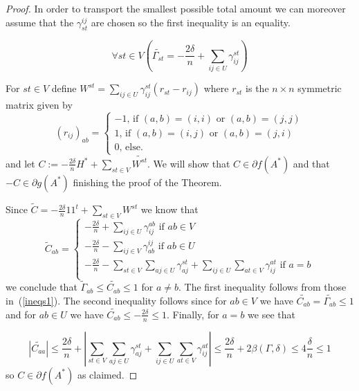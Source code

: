 \documentclass[12pt]{amsart}
\theoremstyle{remark}
\begin{document}
\begin{proof}
In order to transport the smallest possible total amount we can moreover assume that the $\gamma_{st}^{ij}$ are chosen so the first inequality is an equality.

\[\forall st\in V\left( \widetilde{\Gamma_{st}}  = -\frac{2\delta}{n} +\sum_{ij\in U}\gamma_{ij}^{st}\right)\]


For $st\in V$ define $W^{st}=\sum_{ij\in U} \gamma_{ij}^{st}(r_{st}-r_{ij})$ where $r_{st}$ is the $n\times n$ symmetric matrix given by
\[(r_{ij})_{ab}=
\begin{cases}
-1\text{, if $(a,b)=(i,i)$ or $(a,b)=(j,j)$}\\
1\text{, if $(a,b)=(i,j)$ or $(a,b)=(j,i)$}\\
0\text{, else.}
\end{cases}\]
and let $C:=-\frac{2\delta}{n}H^* +\sum_{st\in V} \widetilde{W^{st}}$. We will show that $C\in \partial f(A^*)$ and that $-C\in \partial g(A^*)$ finishing the proof of the Theorem.

Since $\widetilde{C}=-\frac{2\delta}{n}11^t+\sum_{st\in V} W^{st}$ we know that
\[
\widetilde{C}_{ab}= 
\begin{cases}
-\frac{2\delta}{n} +\sum_{ij\in U} \gamma_{ij}^{ab}\text{ if $ab\in V$}\\
-\frac{2\delta}{n} -\sum_{ij\in V} \gamma_{ab}^{ij}\text{ if $ab\in U$}\\
-\frac{2\delta}{n} -\sum_{st\in V}\sum_{aj\in U} \gamma_{aj}^{st} + \sum_{ij\in U}\sum_{at\in V} \gamma_{ij}^{at}\text{ if $a=b$}\\
\end{cases}
\]
we conclude that $\widetilde{\Gamma}_{ab}\leq \widetilde{C_{ab}}\leq 1$ for $a\neq b$. The first inequality follows from those in~(\ref{ineqs1}). The second inequality follows since for $ab\in V$ we have $\widetilde{C_{ab}}=\widetilde{\Gamma_{ab}}\leq 1$ and for $ab\in U$ we have $\widetilde{C_{ab}}\leq -\frac{2\delta}{n}\leq 1$. 
Finally, for $a=b$ we see that 

\[ |\widetilde{C_{aa}}|\leq \frac{2\delta}{n} + \left|\sum_{st\in V}\sum_{aj\in U} \gamma_{aj}^{st} + \sum_{ij\in U}\sum_{at\in V} \gamma_{ij}^{at}\right| \leq \frac{2\delta}{n} + 2\beta(\Gamma,\delta)\leq 4\frac{\delta}{n}\leq 1 \]
so $C\in \partial f(A^*)$ as claimed.



\end{proof}
\end{document}
